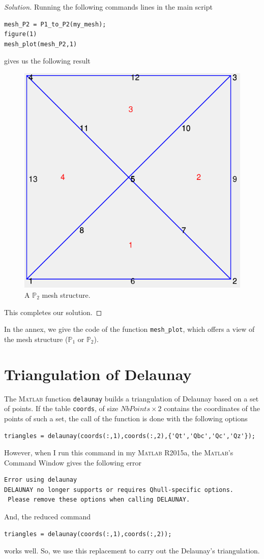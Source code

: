 \documentclass[11pt,a4paper,center,notitlepage]{article}
\numberwithin{equation}{section}
\begin{document}
\begin{proof}[Solution]
Running the following commands lines in the main script
\begin{verbatim}
mesh_P2 = P1_to_P2(my_mesh);
figure(1)
mesh_plot(mesh_P2,1)
\end{verbatim}
gives us the following result
\begin{figure}[H]
\centering
\includegraphics[scale=0.9]{Mesh_P2}
\caption{A $\mathbb{P}_2$ mesh structure.}
\end{figure}
This completes our solution.
\end{proof}
In the annex, we give the code of the function \verb|mesh_plot|, which offers a view of the mesh structure ($\mathbb{P}_1$ or $\mathbb{P}_2$).

\section{Triangulation of Delaunay}
The \textsc{Matlab} function \texttt{delaunay} builds a triangulation of Delaunay based on a set of points. If the table \texttt{coords}, of size $NbPoints \times 2$ contains the coordinates of the points of such a set, the call of the function is done with the following options
\begin{verbatim}
triangles = delaunay(coords(:,1),coords(:,2),{'Qt','Qbc','Qc','Qz'});
\end{verbatim}
However, when I run this command in my \textsc{Matlab} R2015a, the \textsc{Matlab}'s Command Window gives the following error
\begin{verbatim}
Error using delaunay
DELAUNAY no longer supports or requires Qhull-specific options.
 Please remove these options when calling DELAUNAY.
\end{verbatim}
And, the reduced command
\begin{verbatim}
triangles = delaunay(coords(:,1),coords(:,2));
\end{verbatim}
works well. So, we use this replacement to carry out the Delaunay's triangulation.
\end{document}
